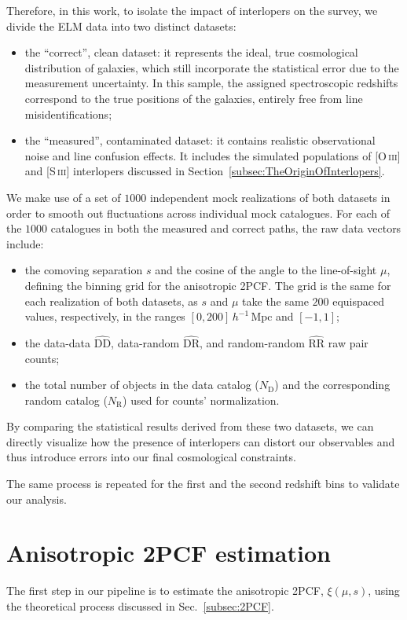 \documentclass[12pt,a4paper,oneside]{report}
\begin{document}
Therefore, in this work, to isolate the impact of interlopers on the survey, we divide the ELM data into two distinct datasets:
\begin{itemize}
  \item the “correct”, clean dataset: it represents the ideal, true cosmological distribution of galaxies, which still incorporate the statistical error due to the measurement uncertainty. In this sample, the assigned spectroscopic redshifts correspond to the true positions of the galaxies, entirely free from line misidentifications; 
  \item the “measured”, contaminated dataset: it contains realistic observational noise and line confusion effects. It includes the simulated populations of [O\,\textsc{iii}] and [S\,\textsc{iii}] interlopers discussed in Section~\ref{subsec:TheOriginOfInterlopers}.
\end{itemize}

We make use of a set of $1000$ independent mock realizations of both datasets in order to smooth out fluctuations across individual mock catalogues. For each of the $1000$ catalogues in both the measured and correct paths, the raw data vectors include:
\begin{itemize}
  \item the comoving separation $s$ and the cosine of the angle to the line-of-sight $\mu$, defining the binning grid for the anisotropic 2PCF. The grid is the same for each realization of both datasets, as $s$ and $\mu$ take the same $200$ equispaced values, respectively, in the ranges $[0, 200] \, h^{-1}\,\mathrm{Mpc}$ and $[-1,1]$;
  \item the data-data $\mathrm{\widehat{DD}}$, data-random $\mathrm{\widehat{DR}}$, and random-random $\mathrm{\widehat{RR}}$ raw pair counts;
  \item the total number of objects in the data catalog ($N_\mathrm{D}$) and the corresponding random catalog ($N_\mathrm{R}$) used for counts' normalization.
\end{itemize}
By comparing the statistical results derived from these two datasets, we can directly visualize how the presence of interlopers can distort our observables and thus introduce errors into our final cosmological constraints.

The same process is repeated for the first and the second redshift bins to validate our analysis.

\section{Anisotropic 2PCF estimation}\label{sec:Anisotropic2PCFEstimation}
The first step in our pipeline is to estimate the anisotropic 2PCF, $\xi(\mu, s)$, using the theoretical process discussed in Sec.~\ref{subsec:2PCF}.
\end{document}
